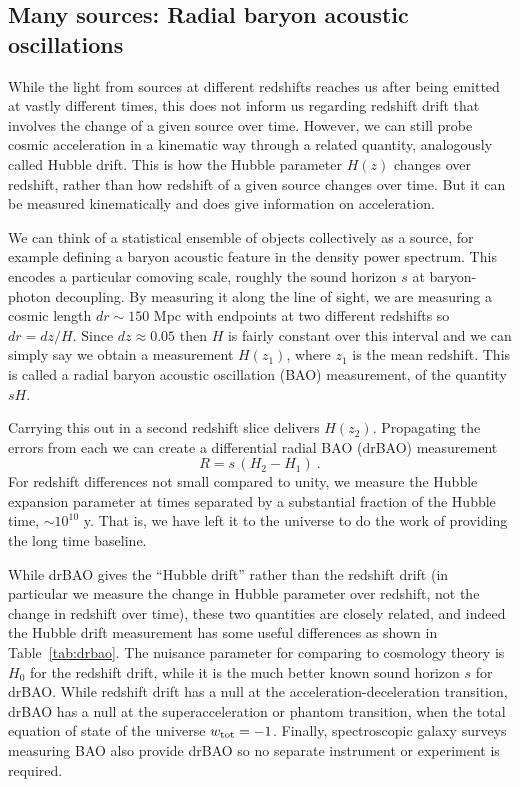 \documentclass[preprint2, 10pt]{aastex}
\newcommand{\be}{\begin{equation}}
\newcommand{\ee}{\end{equation}}
\begin{document}
\subsection{Many sources: Radial baryon acoustic oscillations} \label{sec:rbao} 

While the light from sources at different redshifts reaches us after 
being emitted at vastly different times, this does not inform us regarding 
redshift drift that involves the change of a given source over time.  
However, we can still probe cosmic acceleration in a kinematic way through 
a related quantity, analogously called Hubble drift. This is how the Hubble 
parameter $H(z)$ changes over redshift, rather than how redshift of a given 
source changes over time. But it can be measured kinematically and does 
give information on acceleration. 

We can think of a statistical ensemble of objects collectively as 
a source, for example 
defining a baryon acoustic feature in the density power spectrum.  This 
encodes a particular comoving scale, roughly the sound horizon $s$ at 
baryon-photon decoupling.  By measuring it along the line of sight, we 
are measuring a cosmic length $dr\sim150$ Mpc with endpoints at two 
different redshifts so $dr=dz/H$.  Since $dz\approx0.05$ then $H$ is 
fairly constant over this interval and we can simply say we obtain a 
measurement $H(z_1)$, where $z_1$ is the mean redshift.  This is called a 
radial baryon acoustic oscillation (BAO) measurement, of the quantity 
$sH$. 

Carrying this out in a second redshift slice delivers $H(z_2)$.  Propagating 
the errors from each we can create a differential radial BAO (drBAO) 
measurement 
\be 
R=s\,(H_2-H_1) \ . \label{eq:drbao} 
\ee 
For redshift differences not small compared to unity, we measure the 
Hubble expansion parameter at times separated by a substantial fraction 
of the Hubble time, $\sim10^{10}$ y.  That is, we have left it to the universe 
to do the work of providing the long time baseline.  

While drBAO gives the ``Hubble drift'' rather than the redshift drift 
(in particular we measure the change in Hubble parameter over redshift, 
not the change in redshift over time), these two quantities are 
closely related, and indeed the Hubble drift measurement has some 
useful differences as shown in Table~\ref{tab:drbao}.  The nuisance 
parameter for comparing to cosmology theory is $H_0$ for the redshift 
drift, while it is the much better known sound horizon $s$ for drBAO.  
While redshift drift has a null at the acceleration-deceleration transition, 
drBAO has a null at the superacceleration or phantom transition, when the 
total equation of state of the universe $w_{\rm tot}=-1$.  Finally, 
spectroscopic galaxy surveys measuring BAO also provide drBAO so no 
separate instrument or experiment is required. 
\end{document}
